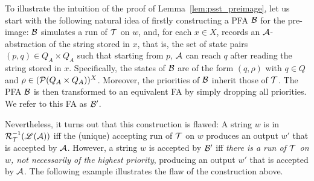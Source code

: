         To illustrate the intuition of the proof of Lemma~\ref{lem:psst_preimage}, let us start with the following natural idea of firstly constructing a PFA $\mathcal{B}$ for the pre-image: $\mathcal{B}$ simulates a run of $\mathcal{T}$ on $w$, and, for each $x \in X$, records an $\mathcal{A}$-abstraction of the string stored in $x$, that is, the set of state pairs $(p, q) \in Q_A \times Q_A$ such that starting from $p$, $\mathcal{A}$ can reach $q$ after reading the string stored in $x$. Specifically, the states of $\mathcal{B}$ are of the form $(q, \rho)$ with $q \in Q$ and $\rho \in (\mathcal{P}(Q_A \times Q_A ))^{X}$. Moreover, the priorities of $\mathcal{B}$ inherit those of $\mathcal{T}$. The PFA $\mathcal{B}$ is then transformed to an equivalent FA by simply dropping all priorities. We refer to this FA as $\mathcal{B}'$.

        Nevertheless, it turns out that this construction is flawed: A string $w$ is in $\mathcal{R}^{-1}_{\mathcal{T}}(\mathscr{L}(\mathcal{A}))$ iff the (unique) accepting run of $\mathcal{T}$ on $w$ produces an output $w'$ that is accepted by $\mathcal{A}$. However, a string $w$ is accepted by $\mathcal{B}'$ iff \emph{there is a run of $\mathcal{T}$ on $w$, not necessarily of the highest priority}, producing an output $w'$ that is accepted by $\mathcal{A}$. The following example illustrates the flaw of the construction above.

